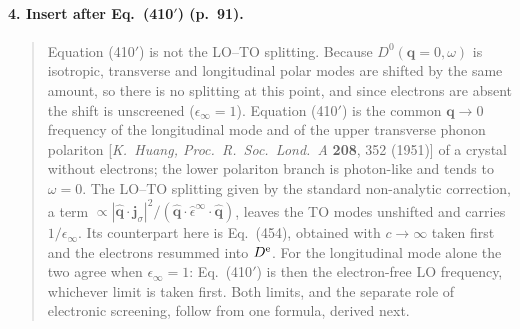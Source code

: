 \documentclass[11pt]{article}
\begin{document}
\paragraph{4. Insert after Eq.~(410$'$) (p.~91).}
\begin{quote}
Equation (410$'$) is not the LO--TO splitting. Because $D^0(\mathbf q=0,\omega)$ is isotropic, transverse
and longitudinal polar modes are shifted by the same amount, so there is no splitting at this point, and
since electrons are absent the shift is unscreened ($\epsilon_\infty=1$). Equation (410$'$) is the common
$\mathbf q\to0$ frequency of the longitudinal mode and of the upper transverse phonon polariton
[\textit{K.~Huang, Proc.\ R.\ Soc.\ Lond.\ A} \textbf{208}, 352 (1951)] of a crystal without electrons; the
lower polariton branch is photon-like and tends to $\omega=0$. The LO--TO splitting given by the standard
non-analytic correction, a term $\propto|\hat{\mathbf q}\cdot\mathbf j_\sigma|^2/(\hat{\mathbf q}\cdot
\hat\epsilon^\infty\cdot\hat{\mathbf q})$, leaves the TO modes unshifted and carries $1/\epsilon_\infty$. Its
counterpart here is Eq.~(454), obtained with $c\to\infty$ taken first and the electrons resummed into
$D^{\rm e}$. For the longitudinal mode alone the two agree when $\epsilon_\infty=1$: Eq.~(410$'$) is then
the electron-free LO frequency, whichever limit is taken first. Both limits, and the separate role of
electronic screening, follow from one formula, derived next.
\end{quote}
\end{document}
